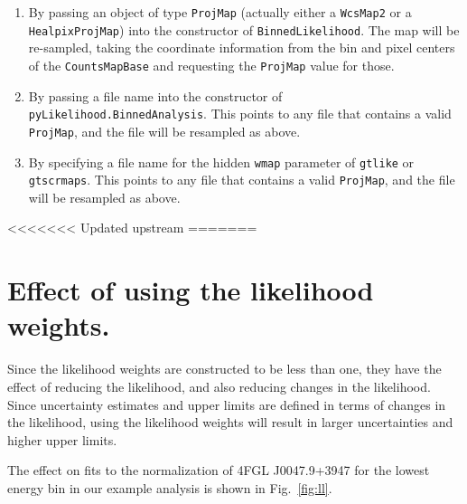 \documentclass[preprint]{aastex}
\begin{document}
\begin{enumerate}
\item{By passing an object of type {\tt ProjMap} (actually either a
    {\tt WcsMap2} or a {\tt HealpixProjMap}) into the constructor of
    {\tt BinnedLikelihood}.  The map will be re-sampled, taking the
    coordinate information from the bin and pixel centers of the {\tt CountsMapBase}
    and requesting the {\tt ProjMap} value for those.}
\item{By passing a file name into the constructor of {\tt
      pyLikelihood.BinnedAnalysis}.  This points to any file that
    contains a valid {\tt ProjMap}, and the file will be 
    resampled as above.}
\item{By specifying a file name for the hidden {\tt wmap} parameter of
    {\tt gtlike} or {\tt gtscrmaps}.  This points to any file that
    contains a valid {\tt ProjMap}, and the file will be 
    resampled as above.}
\end{enumerate}

<<<<<<< Updated upstream
=======

\section{Effect of using the likelihood weights.}

Since the likelihood weights are constructed to be less than one, they 
have the effect of reducing the likelihood, and also reducing changes in 
the likelihood.  Since uncertainty estimates and upper limits are defined
in terms of changes in the likelihood, using the likelihood weights 
will result in larger uncertainties and higher upper limits.  

The effect on fits to the normalization of 4FGL J0047.9+3947 
for the lowest energy bin in our example analysis is shown in Fig.~\ref{fig:ll}.
\end{document}

